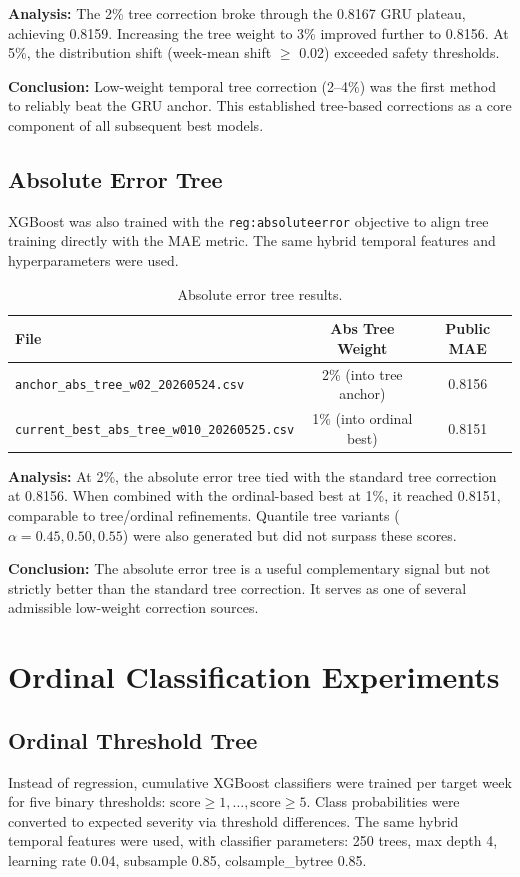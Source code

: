 \documentclass[12pt, a4paper]{article}
\begin{document}
\textbf{Analysis:} The 2\% tree correction broke through the 0.8167 GRU plateau, achieving 0.8159. Increasing the tree weight to 3\% improved further to 0.8156. At 5\%, the distribution shift (week-mean shift $\ge$ 0.02) exceeded safety thresholds.

\textbf{Conclusion:} Low-weight temporal tree correction (2--4\%) was the first method to reliably beat the GRU anchor. This established tree-based corrections as a core component of all subsequent best models.

\subsection{Absolute Error Tree}
XGBoost was also trained with the \texttt{reg:absoluteerror} objective to align tree training directly with the MAE metric. The same hybrid temporal features and hyperparameters were used.

\begin{table}[H]
\centering
\caption{Absolute error tree results.}
\label{tab:abs}
\begin{tabular}{@{}lcc@{}}
\toprule
\textbf{File} & \textbf{Abs Tree Weight} & \textbf{Public MAE} \\
\midrule
\texttt{anchor\_abs\_tree\_w02\_20260524.csv}      & 2\% (into tree anchor) & 0.8156 \\
\texttt{current\_best\_abs\_tree\_w010\_20260525.csv} & 1\% (into ordinal best) & 0.8151 \\
\bottomrule
\end{tabular}
\end{table}

\textbf{Analysis:} At 2\%, the absolute error tree tied with the standard tree correction at 0.8156. When combined with the ordinal-based best at 1\%, it reached 0.8151, comparable to tree/ordinal refinements. Quantile tree variants ($\alpha = 0.45, 0.50, 0.55$) were also generated but did not surpass these scores.

\textbf{Conclusion:} The absolute error tree is a useful complementary signal but not strictly better than the standard tree correction. It serves as one of several admissible low-weight correction sources.

\section{Ordinal Classification Experiments}

\subsection{Ordinal Threshold Tree}
Instead of regression, cumulative XGBoost classifiers were trained per target week for five binary thresholds: $\text{score} \ge 1, \dots, \text{score} \ge 5$. Class probabilities were converted to expected severity via threshold differences. The same hybrid temporal features were used, with classifier parameters: 250 trees, max depth 4, learning rate 0.04, subsample 0.85, colsample\_bytree 0.85.
\end{document}
